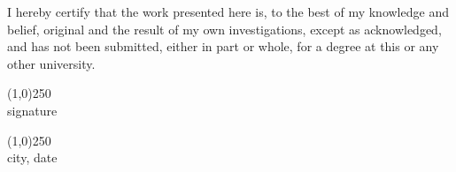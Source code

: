 
I hereby certify that the work presented here is, to the best of my knowledge and belief,
original and the result of my own investigations, except as acknowledged, and has not
been submitted, either in part or whole, for a degree at this or any other university.

\vspace*{4cm}

\begin{flushleft}
\line(1,0){250}\\
signature
\end{flushleft}

\bigskip

\begin{flushleft}
\line(1,0){250}\\
city, date
\end{flushleft}
\clearpage